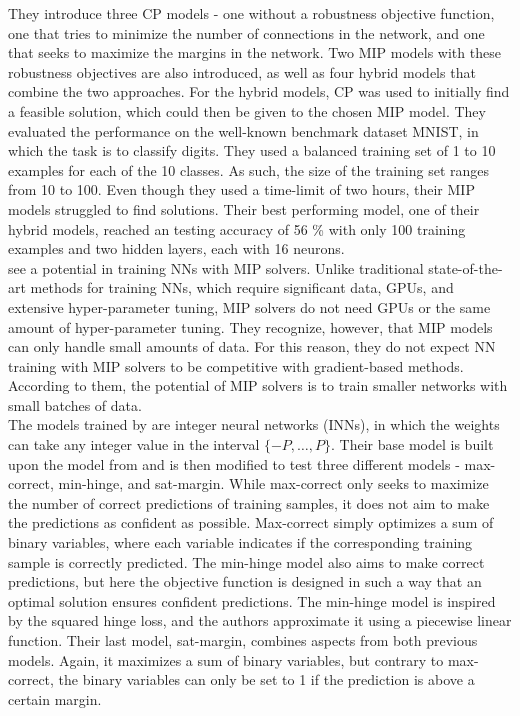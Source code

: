 \noindent They introduce three CP models - one without a robustness objective function, one that tries to minimize the number of connections in the network, and one that seeks to maximize the margins in the network. Two MIP models with these robustness objectives are also introduced, as well as four hybrid models that combine the two approaches. For the hybrid models, CP was used to initially find a feasible solution, which could then be given to the chosen MIP model. They evaluated the performance on the well-known benchmark dataset MNIST, in which the task is to classify digits. They used a balanced training set of 1 to 10 examples for each of the 10 classes. As such, the size of the training set ranges from 10 to 100. Even though they used a time-limit of two hours, their MIP models struggled to find solutions. Their best performing model, one of their hybrid models, reached an testing accuracy of 56 \% with only 100 training examples and two hidden layers, each with 16 neurons. \\

\noindent \cite{thorbjarnason2023} see a potential in training NNs with MIP solvers. Unlike traditional state-of-the-art methods for training NNs, which require significant data, GPUs, and extensive hyper-parameter tuning, MIP solvers do not need GPUs or the same amount of hyper-parameter tuning. They recognize, however, that MIP models can only handle small amounts of data. For this reason, they do not expect NN training with MIP solvers to be competitive with gradient-based methods. According to them, the potential of MIP solvers is to train smaller networks with small batches of data. \\

\noindent The models trained by \cite{thorbjarnason2023} are integer neural networks (INNs), in which the weights can take any integer value in the interval $ \{-P, \ldots, P \}$. Their base model is built upon the model from \cite{icarte2019} and is then modified to test three different models - max-correct, min-hinge, and sat-margin. While max-correct only seeks to maximize the number of correct predictions of training samples, it does not aim to make the predictions as confident as possible. Max-correct simply optimizes a sum of binary variables, where each variable indicates if the corresponding training sample is correctly predicted. The min-hinge model also aims to make correct predictions, but here the objective function is designed in such a way that an optimal solution ensures confident predictions. The min-hinge model is inspired by the squared hinge loss, and the authors approximate it using a piecewise linear function. Their last model, sat-margin, combines aspects from both previous models. Again, it maximizes a sum of binary variables, but contrary to max-correct, the binary variables can only be set to 1 if the prediction is above a certain margin. \\

